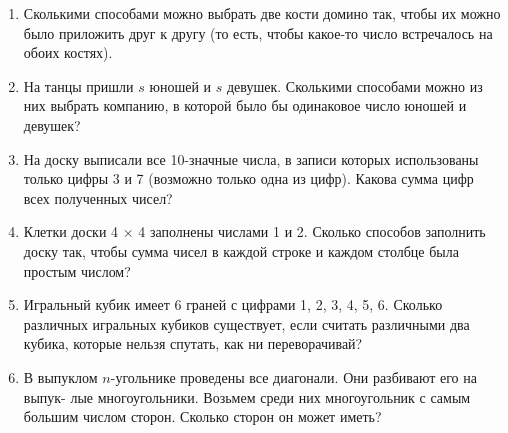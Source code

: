 \documentclass{article}
\begin{document}
\begin{enumerate}[label*=\protect\fbox{\arabic{enumi}}]
\item Сколькими способами можно выбрать две кости домино так, чтобы их можно было приложить друг к другу (то есть, чтобы какое-то число встречалось на обоих костях).

\item На танцы пришли $s$ юношей и $s$ девушек. Сколькими способами можно из них выбрать компанию, в которой было бы одинаковое число юношей и девушек?

\item На доску выписали все 10-значные числа, в записи которых использованы только цифры 3 и 7 (возможно только одна из цифр). Какова сумма цифр всех полученных чисел?
\item Клетки доски 4 × 4 заполнены числами 1 и 2. Сколько способов заполнить доску так, чтобы сумма чисел в каждой строке и каждом столбце была простым числом?
\item Игральный кубик имеет 6 граней с цифрами 1, 2, 3, 4, 5, 6. Сколько различных игральных кубиков существует, если считать различными два кубика, которые нельзя спутать, как ни переворачивай?
\item В выпуклом $n$-угольнике проведены все диагонали. Они разбивают его на выпук- лые многоугольники. Возьмем среди них многоугольник с самым большим числом сторон. Сколько сторон он может иметь?


\end{enumerate}
\end{document}
